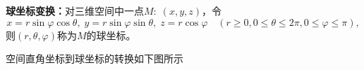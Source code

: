 \begin{thx}
	{\bf 球坐标变换：}对三维空间中一点$M:\;(x,y,z)$，令
	$$x=r\sin\varphi\cos\theta,\;y=r\sin\varphi\sin\theta,\;z=r\cos\varphi
	\quad(r\geq 0,0\leq\theta\leq 2\pi,0\leq\varphi\leq\pi),$$
	则$(r,\theta,\varphi)$称为$M$的球坐标。
\end{thx}
空间直角坐标到球坐标的转换如下图所示
\begin{center}
	\quad
\end{center}
